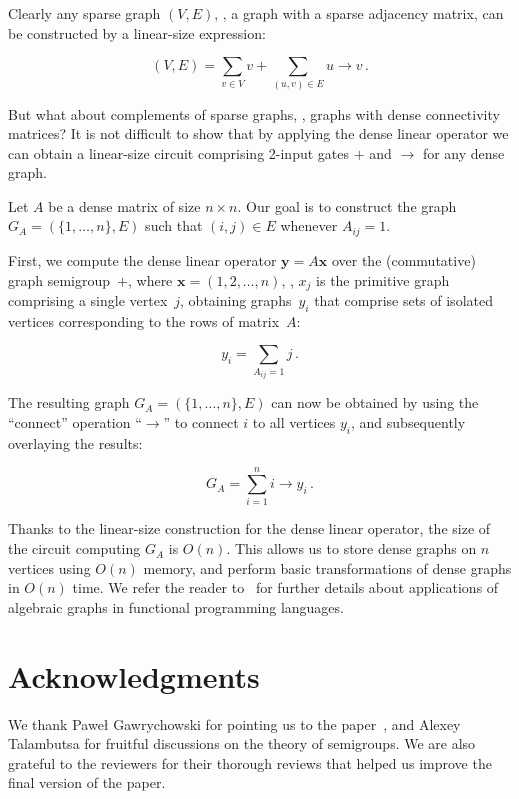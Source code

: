 \documentclass{toc}
\begin{document}
\noindent
Clearly any sparse graph $(V, E)$, \ie, a graph with a sparse
adjacency  %
matrix, can be constructed by a linear-size expression:

\[
(V, E) = \sum_{v \in V} v + \sum_{(u,v) \in E} u \rightarrow v\,.
\]

\noindent
But what about complements of sparse graphs, \ie, graphs with dense
connectivity matrices?  %
It is not difficult to show that by applying the dense
linear operator we can obtain a linear-size circuit comprising 2-input gates
$+$ and $\rightarrow$ for any dense graph.

Let $A$ be a dense matrix of size $n\times n$. Our goal is to construct the
graph $G_A = (\{1, \dots, n\}, E)$ such that $(i,j) \in E$ whenever $A_{ij}=1$.

First, we compute the dense linear operator $\mathbf{y} = A \mathbf{x}$ over the
(commutative) graph semigroup~$+$, where $\mathbf{x} = (1, 2, \dots, n)$, \ie,
$x_j$ is the primitive graph comprising a single vertex~$j$, obtaining
graphs~$y_i$ that comprise sets of isolated vertices corresponding to the rows
of matrix~$A$:

\[
y_i = \sum_{A_{ij}=1} j \, .
\]

The resulting graph $G_A = (\{1, \dots, n\}, E)$ can now be obtained by using
the %
``connect''  %
operation %
``$\rightarrow$''  %
to connect $i$ to all vertices $y_i$,  %
and subsequently overlaying the results:

\[
G_A = \sum_{i=1}^{n} i \rightarrow y_i\,.
\]

Thanks to the linear-size construction for the dense linear operator, the size
of the circuit computing $G_A$ is $O(n)$. This allows us to store dense graphs
on $n$ vertices using $O(n)$ memory, and perform basic transformations of dense
graphs in $O(n)$ time. We refer the reader to~\cite{mokhov2017algebraic} for
further details about applications of algebraic graphs in functional programming
languages.


\section*{Acknowledgments}
We thank
Pawe\l{} Gawrychowski
for pointing us to the
paper~\cite{DBLP:journals/ijcga/ChazelleR91}, and Alexey Talambutsa for
fruitful discussions on the theory of semigroups.
We are also grateful to the reviewers for their thorough reviews that helped us
improve the final version of the paper.
\end{document}
